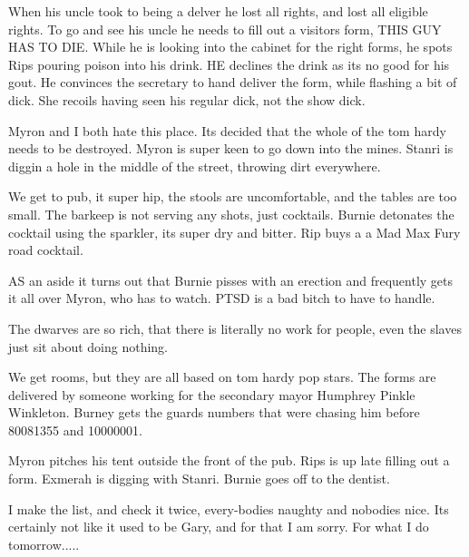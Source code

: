 When his uncle took to being a delver he lost all rights, and lost all eligible rights. To go and see his uncle he needs to fill out a visitors form, THIS GUY HAS TO DIE. While he is looking into the cabinet for the right forms, he spots Rips pouring poison into his drink. HE declines the drink as its no good for his gout. He convinces the secretary to hand deliver the form, while flashing a bit of dick. She recoils having seen his regular dick, not the show dick.\medskip

Myron and I both hate this place. Its decided that the whole of the tom hardy needs to be destroyed. Myron is super keen to go down into the mines. Stanri is diggin a hole in the middle of the street, throwing dirt everywhere.\medskip

We get to pub, it super hip, the stools are uncomfortable, and the tables are too small. The barkeep is not serving any shots, just cocktails. Burnie detonates the cocktail using the sparkler, its super dry and bitter. Rip buys a a Mad Max Fury road cocktail.\medskip

AS an aside it turns out that Burnie pisses with an erection and frequently gets it all over Myron, who has to watch. PTSD is a bad bitch to have to handle.\medskip

The dwarves are so rich, that there is literally no work for people, even the slaves just sit about doing nothing.\medskip

We get rooms, but they are all based on tom hardy pop stars. The forms are delivered by someone working for the secondary mayor Humphrey Pinkle Winkleton. Burney gets the guards numbers that were chasing him before 80081355 and 10000001.\medskip

Myron pitches his tent outside the front of the pub. Rips is up late filling out a form. Exmerah is digging with Stanri. Burnie goes off to the dentist.\medskip

I make the list, and check it twice, every-bodies naughty and nobodies nice. Its certainly not like it used to be Gary, and for that I am sorry. For what I do tomorrow.....\medskip




%

\clearpage